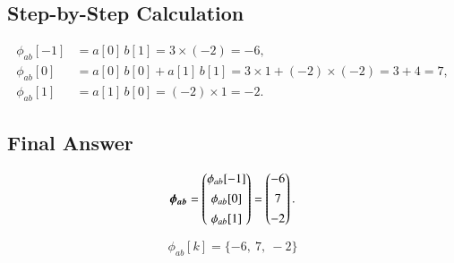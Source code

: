 \documentclass[journal,12pt,onecolumn]{IEEEtran}
\begin{document}
\subsection*{Step-by-Step Calculation}

\[
\begin{aligned}
\phi_{ab}[-1] &= a[0]\,b[1] = 3 \times (-2) = -6, \\
\phi_{ab}[0]  &= a[0]\,b[0] + a[1]\,b[1] = 3\times 1 + (-2)\times (-2) = 3 + 4 = 7, \\
\phi_{ab}[1]  &= a[1]\,b[0] = (-2)\times 1 = -2.
\end{aligned}
\]

\subsection*{Final Answer}

\[
\boldsymbol{{\phi}_{ab}}=
\begin{pmatrix}
\phi_{ab}[-1]\\[0.4em]
\phi_{ab}[0]\\[0.4em]
\phi_{ab}[1]
\end{pmatrix}
=
\begin{pmatrix}
-6\\[0.4em]
7\\[0.4em]
-2
\end{pmatrix}.
\]

\[
\boxed{\phi_{ab}[k] = \{-6,\ 7,\ -2\}}
\]
\end{document}
